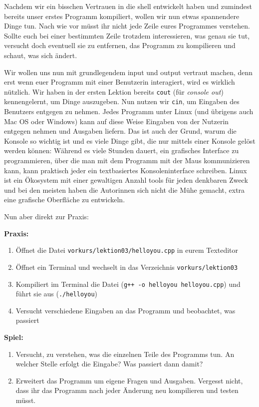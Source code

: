 
Nachdem wir ein bisschen Vertrauen in die shell entwickelt haben und zumindest
bereits unser erstes Programm kompiliert, wollen wir nun etwas spannendere
Dinge tun. Nach wie vor müsst ihr nicht jede Zeile eures Programmes verstehen.
Sollte euch bei einer bestimmten Zeile trotzdem interessieren, was genau sie
tut, versucht doch eventuell sie zu entfernen, das Programm zu kompilieren und
schaut, was sich ändert.

Wir wollen uns nun mit grundlegendem input und output vertraut machen, denn
erst wenn euer Programm mit einer Benutzerin interagiert, wird es wirklich
nützlich. Wir haben in der ersten Lektion bereits \texttt{cout} (für
\emph{console out}) kennengelernt, um Dinge auszugeben. Nun nutzen wir
\texttt{cin}, um Eingaben des Benutzers entgegen zu nehmen. Jedes Programm
unter Linux (und übrigens auch Mac OS oder Windows) kann auf diese Weise
Eingaben von der Nutzerin entgegen nehmen und Ausgaben liefern. Das ist auch
der Grund, warum die Konsole so wichtig ist und es viele Dinge gibt, die nur
mittels einer Konsole gelöst werden können: Während es viele Stunden dauert,
ein grafisches Interface zu programmieren, über die man mit dem Programm mit
der Maus kommunizieren kann, kann praktisch jeder ein textbasiertes
Konsoleninterface schreiben. Linux ist ein Ökosystem mit einer gewaltigen
Anzahl tools für jeden denkbaren Zweck und bei den meisten haben die Autorinnen
sich nicht die Mühe gemacht, extra eine grafische Oberfläche zu entwickeln.

Nun aber direkt zur Praxis:

\textbf{Praxis:}
\begin{enumerate}
    \item Öffnet die Datei \texttt{vorkurs/lektion03/helloyou.cpp} in eurem Texteditor
    \item Öffnet ein Terminal und wechselt in das Verzeichnis \texttt{vorkurs/lektion03}
    \item Kompiliert im Terminal die Datei (\texttt{g++ -o helloyou
        helloyou.cpp}) und führt sie aus (\texttt{./helloyou})
    \item Versucht verschiedene Eingaben an das Programm und beobachtet, was passiert
\end{enumerate}


\textbf{Spiel:}

\begin{enumerate}
    \item Versucht, zu verstehen, was die einzelnen Teile des Programms tun. An
        welcher Stelle erfolgt die Eingabe? Was passiert dann damit?
    \item Erweitert das Programm um eigene Fragen und Ausgaben. Vergesst nicht,
        dass ihr das Programm nach jeder Änderung neu kompilieren und testen
        müsst.
\end{enumerate}

